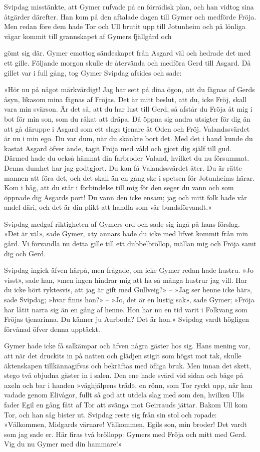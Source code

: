 Svipdag misstänkte, att Gymer rufvade på en förrädisk plan, och han
vidtog sina åtgärder därefter. Han kom på den aftalade dagen till Gymer
och medförde Fröja. Men redan före dem hade Tor och Ull brutit upp till
Jotunheim och på lönliga vägar kommit till grannskapet af Gymers
fjällgård och

gömt sig där. Gymer emottog sändeskapet från Asgard väl och hedrade det
med ett gille. Följande morgon skulle de återvända och medföra Gerd till
Asgard. Då gillet var i full gång, tog Gymer Svipdag afsides och sade:

»Hör nu på något märkvärdigt! Jag har sett på dina ögon, att du fägnas
af Gerds åsyn, likasom mina fägnas af Fröjas. Det är mitt beslut, att
du, icke Fröj, skall vara min svärson. Är det så, att du har lust till
Gerd, så afstår du Fröja åt mig i bot för min son, som du råkat att
dräpa. Då öppna sig andra utsigter för dig än att gå däruppe i Asgard
som ett slags tjenare åt Oden och Fröj. Valandssvärdet är nu i min ego.
Du var dum, när du skänkte bort det. Med det i hand kunde du kastat
Asgard öfver ände, tagit Fröja med våld och gjort dig själf till gud.
Därmed hade du också hämnat din farbroder Valand, hvilket du nu
försummat. Denna dumhet har jag godtgjort. Du kan få Valandssvärdet
åter. Du är rätte mannen att föra det, och det skall än en gång ske i
spetsen för Jotunheims härar. Kom i håg, att du står i förbindelse till
mig för den seger du vann och som öppnade dig Asgards port! Du vann den
icke ensam; jag och mitt folk hade vår andel däri, och det är din plikt
att handla som vår bundsförvandt.»

Svipdag medgaf riktigheten af Gymers ord och sade sig ingå på hans
förslag. »Det är väl», sade Gymer, »ty annars hade du icke med lifvet
kommit från min gård. Vi förvandla nu detta gille till ett
dubbelbröllop, mällan mig och Fröja samt dig och Gerd.

Svipdag ingick äfven härpå, men frågade, om icke Gymer redan hade
hustru. »Jo visst», sade han, »men ingen hindrar mig att ha så många
hustrur jag vill. Har du icke hört ryktesvis, att jag är gift med
Gullveig?» -- »Jag ser henne icke här», sade Svipdag; »hvar finns hon?»
-- »Jo, det är en lustig sak», sade Gymer; »Fröja har låtit narra sig än
en gång af henne. Hon har nu en tid varit i Folkvang som Fröjas
tjenarinna. Du känner ju Aurboda? Det är hon.» Svipdag vardt högligen
förvånad öfver denna upptäckt.



Gymer hade icke få salkämpar och äfven några gäster hos sig. Hans mening
var, att när det druckits in på natten och glädjen stigit som högst mot
tak, skulle äktenskapen tillkännagifvas och bekräftas med öfliga bruk.
Men innan det skett, stego två objudna gäster in i salen. Den ene hade
svärd vid sidan och båge på axeln och bar i handen »väghjälpens träd»,
en rönn, som Tor ryckt upp, när han vadade genom Elivågor, fullt så god
att utdela slag med som den, hvilken Ulls fader Egil en gång fått af Tor
att svänga mot Geirrauds jättar. Bakom Ull kom Tor, och han såg bister
ut. Svipdag reste sig från sin stol och ropade: »Välkommen, Midgards
värnare! Välkommen, Egils son, min broder! Det vardt som jag sade er.
Här firas två bröllopp: Gymers med Fröja och mitt med Gerd. Vig du nu
Gymer med din hammare!»

